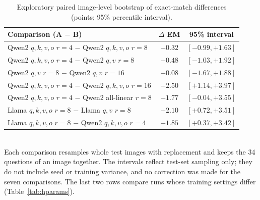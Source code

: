 \begin{table}[htbp]
  \centering
  \caption[Exploratory paired image-level bootstrap of exact-match differences]{Exploratory paired image-level bootstrap of exact-match differences (points; 95\% percentile interval).}
  \label{tab:bootstrap}
  \footnotesize
  \setlength{\tabcolsep}{4pt}
  \begin{tabular}{P{3.1in}cc}
    \toprule
    \textbf{Comparison (A $-$ B)} & \textbf{$\Delta$ EM} & \textbf{95\% interval} \\
    \midrule
    Qwen2 $q,k,v,o$ $r{=}4$ $-$ Qwen2 $q,k,v,o$ $r{=}8$ & $+0.32$ & $[-0.99, +1.63]$ \\
    Qwen2 $q,k,v,o$ $r{=}4$ $-$ Qwen2 $q,v$ $r{=}8$ & $+0.48$ & $[-1.03, +1.92]$ \\
    Qwen2 $q,v$ $r{=}8$ $-$ Qwen2 $q,v$ $r{=}16$ & $+0.08$ & $[-1.67, +1.88]$ \\
    Qwen2 $q,k,v,o$ $r{=}4$ $-$ Qwen2 $q,k,v,o$ $r{=}16$ & $+2.50$ & $[+1.14, +3.97]$ \\
    Qwen2 $q,k,v,o$ $r{=}4$ $-$ Qwen2 all-linear $r{=}8$ & $+1.77$ & $[-0.04, +3.55]$ \\
    Llama $q,k,v,o$ $r{=}8$ $-$ Llama $q,v$ $r{=}8$ & $+2.10$ & $[+0.72, +3.51]$ \\
    Llama $q,k,v,o$ $r{=}8$ $-$ Qwen2 $q,k,v,o$ $r{=}4$ & $+1.85$ & $[+0.37, +3.42]$ \\
    \bottomrule
  \end{tabular}\\[2pt]
  {\footnotesize Each comparison resamples whole test images with replacement and keeps the 34 questions of an image together. The intervals reflect test-set sampling only; they do not include seed or training variance, and no correction was made for the seven comparisons. The last two rows compare runs whose training settings differ (Table~\ref{tab:hparams}).}
\end{table}
